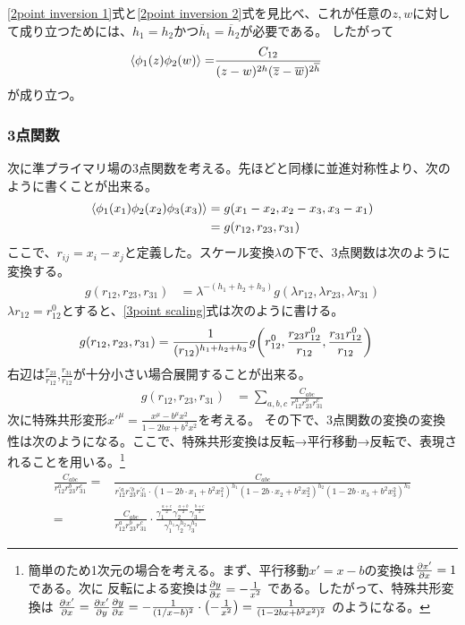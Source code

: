 \documentclass[11pt, dvipdfmx]{article}
\numberwithin{equation}{section}
\begin{document}
\eqref{2point inversion 1}式と\eqref{2point inversion 2}式を見比べ、これが任意の$z,w$に対して成り立つためには、$h_1=h_2$かつ$\overline{h}_1=\overline{h}_2$が必要である。
したがって
\begin{align}
    \ev{\phi_1(z)\phi_2(w)}=&\frac{C_{12}}{(z-w)^{2h}(\overline{z}-\overline{w})^{2\overline{h}}}\label{2point primary}
\end{align}
が成り立つ。
\subsubsection{3点関数}
次に準プライマリ場の3点関数を考える。先ほどと同様に並進対称性より、次のように書くことが出来る。
\begin{align}
    \ev{\phi_1(x_1)\phi_2(x_2)\phi_3(x_3)}&=g(x_1 - x_2,x_2 - x_3,x_3 - x_1)\\
    &=g(r_{12},r_{23},r_{31})
    \end{align}
ここで、$r_{ij}=x_i - x_j$と定義した。スケール変換$\lambda$の下で、3点関数は次のように変換する。
\begin{align}
    g(r_{12},r_{23},r_{31})&=\lambda^{-(h_1 + h_2 + h_3)}g(\lambda r_{12},\lambda r_{23},\lambda r_{31})\label{3point scaling}
\end{align}
$\lambda r_{12}=r_{12}^0$とすると、\eqref{3point scaling}式は次のように書ける。
\begin{align}
    g(r_{12},r_{23},r_{31})&=\frac{1}{(r_{12})^{h_1 + h_2 + h_3}}g\qty(r_{12}^0,\frac{r_{23}r_{12}^0}{r_{12}},\frac{r_{31}r_{12}^0}{r_{12}})\label{3point reduced}
\end{align}
右辺は$\frac{r_{23}}{r_{12}}$,$\frac{r_{31}}{r_{12}}$が十分小さい場合展開することが出来る。
\begin{align}
    g(r_{12},r_{23},r_{31})&=\sum_{a,b,c}\frac{C_{abc}}{r_{12}^ar_{23}^br_{31}^c}
\end{align}
次に特殊共形変形$x'^{\mu} =\frac{x^\mu-b^\mu x^2}{1-2bx+b^{2} x^{2}}$を考える。
その下で、3点関数の変換の変換性は次のようになる。ここで、特殊共形変換は反転→平行移動→反転で、表現されることを用いる。\footnote{
   簡単のため1次元の場合を考える。まず、平行移動$x' = x - b$の変換は$\pdv{x'}{x}=1$である。次に
    反転による変換は$\pdv{y}{x}=-\frac{1}{x^2}$
    である。したがって、特殊共形変換は
    $\pdv{x'}{x}=\pdv{x'}{y}\pdv{y}{x}=-\frac{1}{(1/x-b)^2}\cdot \qty(-\frac{1}{x^2})=\frac{1}{(1-2bx+b^2 x^2)^2}$
    のようになる。
}
\begin{align}
  \frac{C_{abc}}{r_{12}^a r_{23}^b r_{31}^c}=&\frac{C_{abc}}{r_{12}^{'a} r_{23}^{'b} r_{31}^{'c}\cdot (1-2b\cdot x_1 + b^2 x_1^2)^{h_1}(1-2b\cdot x_2 + b^2 x_2^2)^{h_2}(1-2b\cdot x_3 + b^2 x_3^2)^{h_3}}\label{a}\\
  =&\frac{C_{abc}}{r_{12}^{a} r_{23}^{b} r_{31}^{c}}\cdot\frac{\gamma_1^{\frac{a+c}{2}}\gamma_2^{\frac{a+b}{2}}\gamma_3^{\frac{b+c}{2}}}{\gamma_1^{h_1}\gamma_2^{h_2}\gamma_3^{h_3}}\label{b}
\end{align}
\end{document}
